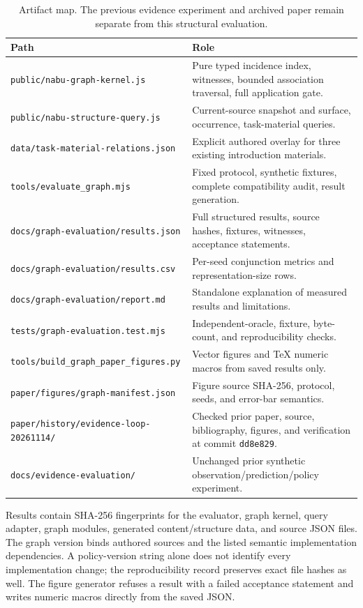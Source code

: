 \documentclass{article}
\newcommand{\artifact}[1]{\nolinkurl{#1}}
\begin{document}
\begin{table}[t]
\caption{Artifact map. The previous evidence experiment and archived paper remain separate from this structural evaluation.}
\centering\small
\begin{tabular}{p{}p{}}
\toprule
Path & Role \\
\midrule
\artifact{public/nabu-graph-kernel.js} & Pure typed incidence index, witnesses, bounded association traversal, full application gate. \\
\artifact{public/nabu-structure-query.js} & Current-source snapshot and surface, occurrence, task-material queries. \\
\artifact{data/task-material-relations.json} & Explicit authored overlay for three existing introduction materials. \\
\artifact{tools/evaluate_graph.mjs} & Fixed protocol, synthetic fixtures, complete compatibility audit, result generation. \\
\artifact{docs/graph-evaluation/results.json} & Full structured results, source hashes, fixtures, witnesses, acceptance statements. \\
\artifact{docs/graph-evaluation/results.csv} & Per-seed conjunction metrics and representation-size rows. \\
\artifact{docs/graph-evaluation/report.md} & Standalone explanation of measured results and limitations. \\
\artifact{tests/graph-evaluation.test.mjs} & Independent-oracle, fixture, byte-count, and reproducibility checks. \\
\artifact{tools/build_graph_paper_figures.py} & Vector figures and TeX numeric macros from saved results only. \\
\artifact{paper/figures/graph-manifest.json} & Figure source SHA-256, protocol, seeds, and error-bar semantics. \\
\artifact{paper/history/evidence-loop-20261114/} & Checked prior paper, source, bibliography, figures, and verification at commit \texttt{dd8e829}. \\
\artifact{docs/evidence-evaluation/} & Unchanged prior synthetic observation/prediction/policy experiment. \\
\bottomrule
\end{tabular}
\end{table}

Results contain SHA-256 fingerprints for the evaluator, graph kernel, query adapter, graph modules, generated content/structure data, and source JSON files. The graph version binds authored sources and the listed semantic implementation dependencies. A policy-version string alone does not identify every implementation change; the reproducibility record preserves exact file hashes as well. The figure generator refuses a result with a failed acceptance statement and writes numeric macros directly from the saved JSON.
\end{document}
